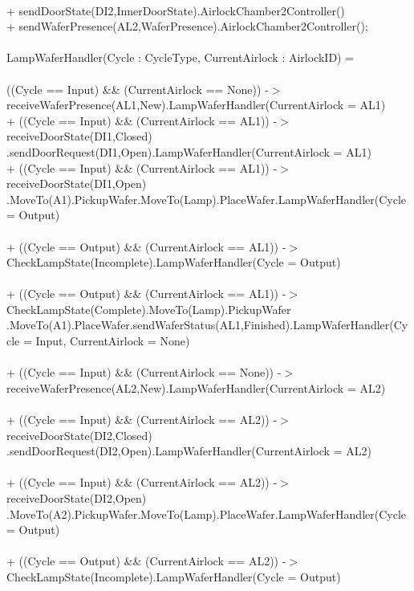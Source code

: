 \documentclass[a4paper,12pt]{article}
\begin{document}
	\\+ sendDoorState(DI2,InnerDoorState).AirlockChamber2Controller()
	\\+ sendWaferPresence(AL2,WaferPresence).AirlockChamber2Controller();
	\\
	\\LampWaferHandler(Cycle : CycleType, CurrentAirlock : AirlockID) = 
	\\
	\\((Cycle == Input) \&\& (CurrentAirlock == None)) -$>$ receiveWaferPresence(AL1,New).LampWaferHandler(CurrentAirlock = AL1)
	\\+ ((Cycle == Input) \&\& (CurrentAirlock == AL1)) -$>$ receiveDoorState(DI1,Closed)
	\\.sendDoorRequest(DI1,Open).LampWaferHandler(CurrentAirlock = AL1)
	\\+ ((Cycle == Input) \&\& (CurrentAirlock == AL1)) -$>$ receiveDoorState(DI1,Open)
	\\.MoveTo(A1).PickupWafer.MoveTo(Lamp).PlaceWafer.LampWaferHandler(Cycle = Output)
	\\
	\\+ ((Cycle == Output) \&\& (CurrentAirlock == AL1)) -$>$ CheckLampState(Incomplete).LampWaferHandler(Cycle = Output)
	\\
	\\+ ((Cycle == Output) \&\& (CurrentAirlock == AL1)) -$>$ CheckLampState(Complete).MoveTo(Lamp).PickupWafer
	\\.MoveTo(A1).PlaceWafer.sendWaferStatus(AL1,Finished).LampWaferHandler(Cycle = Input, CurrentAirlock = None)
	\\
	\\+ ((Cycle == Input) \&\& (CurrentAirlock == None)) -$>$ receiveWaferPresence(AL2,New).LampWaferHandler(CurrentAirlock = AL2)
	\\
	\\+ ((Cycle == Input) \&\& (CurrentAirlock == AL2)) -$>$ receiveDoorState(DI2,Closed)
	\\.sendDoorRequest(DI2,Open).LampWaferHandler(CurrentAirlock = AL2)
	\\
	\\+ ((Cycle == Input) \&\& (CurrentAirlock == AL2)) -$>$ receiveDoorState(DI2,Open)\\.MoveTo(A2).PickupWafer.MoveTo(Lamp).PlaceWafer.LampWaferHandler(Cycle = Output)
	\\
	\\+ ((Cycle == Output) \&\& (CurrentAirlock == AL2)) -$>$ CheckLampState(Incomplete).LampWaferHandler(Cycle = Output)
\end{document}
